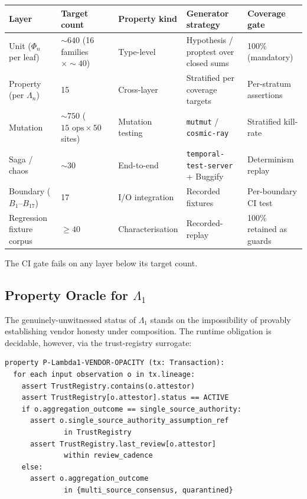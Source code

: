 \documentclass[11pt,a4paper]{article}
\begin{document}
\begin{center}
\renewcommand{\arraystretch}{1.10}
\begin{tabular}{@{}p{3.0cm}p{2.5cm}p{2.5cm}p{3.5cm}p{3.5cm}@{}}
\toprule
\textbf{Layer} & \textbf{Target count} & \textbf{Property kind} & \textbf{Generator strategy} & \textbf{Coverage gate} \\
\midrule
Unit ($\Phi_n$ per leaf)  & $\sim 640$ (16 families $\times \sim 40$) & Type-level     & Hypothesis / proptest over closed sums & 100\% (mandatory) \\
Property (per $\Lambda_n$)& 15                                       & Cross-layer    & Stratified per coverage targets       & Per-stratum assertions \\
Mutation                  & $\sim 750$ ($15 \text{ ops} \times 50$ sites) & Mutation testing & \texttt{mutmut} / \texttt{cosmic-ray} & Stratified kill-rate \\
Saga / chaos              & $\sim 30$                                 & End-to-end     & \texttt{temporal-test-server} + Buggify & Determinism replay \\
Boundary ($B_1$--$B_{17}$)& 17                                       & I/O integration& Recorded fixtures                      & Per-boundary CI test \\
Regression fixture corpus & $\ge 40$                                  & Characterisation & Recorded-replay                      & 100\% retained as guards \\
\bottomrule
\end{tabular}
\end{center}

The CI gate fails on any layer below its target count.

\subsection{Property Oracle for $\Lambda_1$}
\label{sec:pbt-oracle}

The genuinely-unwitnessed status of $\Lambda_1$ stands on the impossibility of provably establishing vendor honesty under composition. The runtime obligation is decidable, however, via the trust-registry surrogate:

\begin{lstlisting}
property P-Lambda1-VENDOR-OPACITY (tx: Transaction):
  for each input observation o in tx.lineage:
    assert TrustRegistry.contains(o.attestor)
    assert TrustRegistry[o.attestor].status == ACTIVE
    if o.aggregation_outcome == single_source_authority:
      assert o.single_source_authority_assumption_ref
              in TrustRegistry
      assert TrustRegistry.last_review[o.attestor]
              within review_cadence
    else:
      assert o.aggregation_outcome
              in {multi_source_consensus, quarantined}
\end{lstlisting}
\end{document}
